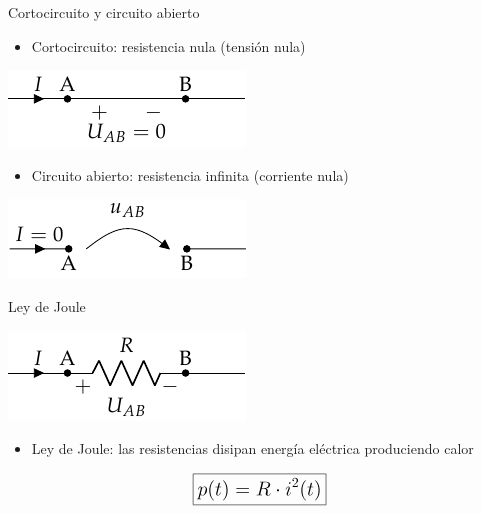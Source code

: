 \documentclass[aspectratio=169, xcolor={usenames,svgnames,dvipsnames}]{beamer}
\begin{document}
\begin{frame}{Cortocircuito y circuito abierto}
    \begin{itemize}
    \item \alert{Cortocircuito}: resistencia nula (tensión nula)
    \end{itemize}
    
    \begin{center}
    \includegraphics[height=0.2\textheight]{../figs/Cortocircuito.pdf}
    \end{center}
    
    \begin{itemize}
    \item \alert{Circuito abierto}: resistencia infinita (corriente nula)
    \end{itemize}
    
    \begin{center}
    \includegraphics[height=0.2\textheight]{../figs/CircuitoAbierto.pdf}
    \end{center}
\end{frame}


\begin{frame}{Ley de Joule}
    \begin{center}
    \includegraphics[height=0.2\textheight]{../figs/Resistencia.pdf}
    \end{center}
    
    \begin{itemize}
    \item \alert{Ley de Joule}: las resistencias disipan energía eléctrica produciendo \alert{calor}
    \end{itemize}
    
    
    \[
    \Large \boxed{p(t)=R\cdot i^{2}(t)}
    \]
\end{frame}
\end{document}
